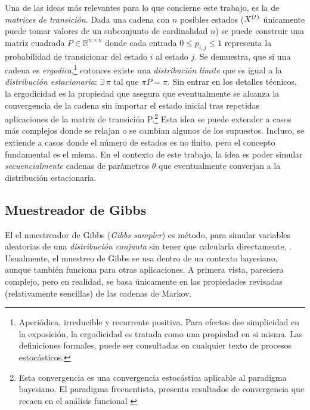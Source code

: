 \documentclass[../Main/Main.tex]{subfiles}
\begin{document}
Una de las ideas más relevantes para lo que concierne este trabajo, es la de \textit{matrices de transición}. Dada una cadena con $n$ posibles estados ($X^{(t)}$ únicamente puede tomar valores de un subconjunto de cardinalidad $n$) se puede construir una matriz cuadrada $P\in\mathbb{R}^{n\times n}$ donde cada entrada $0\leq p_{i,j}\leq1$ representa la probabilidad de transicionar del estado $i$ al estado $j$. Se demuestra, que si una cadena es \textit{ergodica},\footnote{Aperiódica, irreducible y  recurrente positiva. Para efectos dse simplicidad en la exposición, la ergodicidad es tratada como una propiedad en si misma. Las definiciones formales, puede ser consultadas en cualquier texto de procesos estocásticos.} entonces existe una \textit{distribución límite} que es igual a la \textit{distribución estacionaria}: $\exists \,\pi$ tal que $\pi P = \pi$. Sin entrar en los detalles técnicos, la ergodicidad es la propiedad que asegura que eventualmente se alcanza la convergencia de la cadena sin importar el estado inicial tras repetidas aplicaciones de la matriz de transición P.\footnote{Esta convergencia es una convergencia estocástica aplicable al paradigma bayesiano. El paradigma frecuentista, presenta resultados de convergencia que recaen en el análisis funcional \autocite{stone1985additive}} 
Esta idea se puede extender a casos más complejos donde se relajan o se cambian algunos de los supuestos. Incluso, se extiende a casos donde el número de estados es no finito, pero el concepto fundamental es el misma.  En el contexto de este trabajo, la idea es poder simular \textit{secuencialmente} cadenas de parámetros $\theta$ que eventualmente converjan a la distribución estacionaria. 

\subsection{Muestreador de Gibbs}
El el muestreador de Gibbs (\textit{Gibbs sampler}) es método, para simular variables aleatorias de una \textit{distribución conjunta} sin tener que calcularla directamente, \autocite{gelfand1990sampling}. Usualmente, el muestreo de Gibbs se usa dentro de un contexto bayesiano, aunque también funciona para otras aplicaciones. A primera vista, pareciera complejo, pero en realidad, se basa únicamente en las propiedades revisadas (relativamente sencillas) de las cadenas de Markov.
\end{document}
